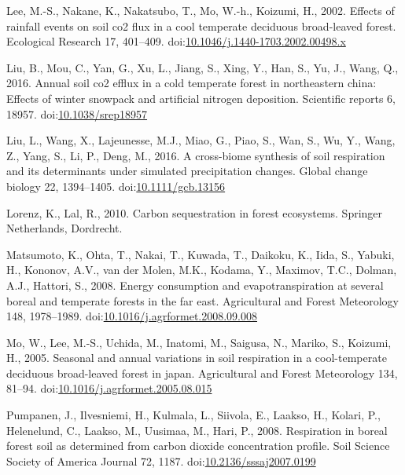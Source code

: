\documentclass[]{elsarticle} %
\begin{document}
\leavevmode\hypertarget{ref-Lee.2002}{}%
Lee, M.-S., Nakane, K., Nakatsubo, T., Mo, W.-h., Koizumi, H., 2002.
Effects of rainfall events on soil co2 flux in a cool temperate
deciduous broad-leaved forest. Ecological Research 17, 401--409.
doi:\href{https://doi.org/10.1046/j.1440-1703.2002.00498.x}{10.1046/j.1440-1703.2002.00498.x}

\leavevmode\hypertarget{ref-Liu2.2016}{}%
Liu, B., Mou, C., Yan, G., Xu, L., Jiang, S., Xing, Y., Han, S., Yu, J.,
Wang, Q., 2016. Annual soil co2 efflux in a cold temperate forest in
northeastern china: Effects of winter snowpack and artificial nitrogen
deposition. Scientific reports 6, 18957.
doi:\href{https://doi.org/10.1038/srep18957}{10.1038/srep18957}

\leavevmode\hypertarget{ref-Liu.2016}{}%
Liu, L., Wang, X., Lajeunesse, M.J., Miao, G., Piao, S., Wan, S., Wu,
Y., Wang, Z., Yang, S., Li, P., Deng, M., 2016. A cross-biome synthesis
of soil respiration and its determinants under simulated precipitation
changes. Global change biology 22, 1394--1405.
doi:\href{https://doi.org/10.1111/gcb.13156}{10.1111/gcb.13156}

\leavevmode\hypertarget{ref-Lorenz.2010}{}%
Lorenz, K., Lal, R., 2010. Carbon sequestration in forest ecosystems.
Springer Netherlands, Dordrecht.

\leavevmode\hypertarget{ref-Matsumoto.2008}{}%
Matsumoto, K., Ohta, T., Nakai, T., Kuwada, T., Daikoku, K., Iida, S.,
Yabuki, H., Kononov, A.V., van der Molen, M.K., Kodama, Y., Maximov,
T.C., Dolman, A.J., Hattori, S., 2008. Energy consumption and
evapotranspiration at several boreal and temperate forests in the far
east. Agricultural and Forest Meteorology 148, 1978--1989.
doi:\href{https://doi.org/10.1016/j.agrformet.2008.09.008}{10.1016/j.agrformet.2008.09.008}

\leavevmode\hypertarget{ref-Mo.2005}{}%
Mo, W., Lee, M.-S., Uchida, M., Inatomi, M., Saigusa, N., Mariko, S.,
Koizumi, H., 2005. Seasonal and annual variations in soil respiration in
a cool-temperate deciduous broad-leaved forest in japan. Agricultural
and Forest Meteorology 134, 81--94.
doi:\href{https://doi.org/10.1016/j.agrformet.2005.08.015}{10.1016/j.agrformet.2005.08.015}

\leavevmode\hypertarget{ref-Pumpanen.2008}{}%
Pumpanen, J., Ilvesniemi, H., Kulmala, L., Siivola, E., Laakso, H.,
Kolari, P., Helenelund, C., Laakso, M., Uusimaa, M., Hari, P., 2008.
Respiration in boreal forest soil as determined from carbon dioxide
concentration profile. Soil Science Society of America Journal 72, 1187.
doi:\href{https://doi.org/10.2136/sssaj2007.0199}{10.2136/sssaj2007.0199}
\end{document}

